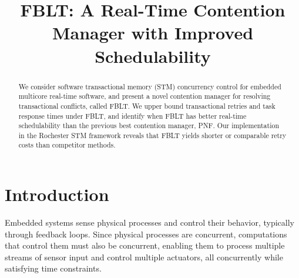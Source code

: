 \documentclass[conference,letterpaper]{IEEEtran}
\begin{document}
%


\title{FBLT: A Real-Time Contention Manager with Improved Schedulability}

\author{
\and
{}
}



\maketitle

\begin{abstract}
We consider software transactional memory (STM) concurrency control for embedded multicore real-time software, and present a novel contention manager for resolving transactional conflicts, called FBLT. We upper bound transactional retries and task response times under FBLT, and identify when FBLT has better real-time schedulability than the previous best contention manager, PNF. 
Our implementation in the Rochester STM framework reveals that FBLT yields shorter or comparable retry costs than competitor methods.
\end{abstract}


\IEEEpeerreviewmaketitle


\section{Introduction}

\label{sec:intro}

Embedded systems sense physical processes and control their behavior, typically through feedback loops. Since physical processes are concurrent, computations that control them must also be concurrent, enabling them to process multiple streams of sensor input and control multiple actuators, all concurrently while satisfying time constraints. 
\end{document}
